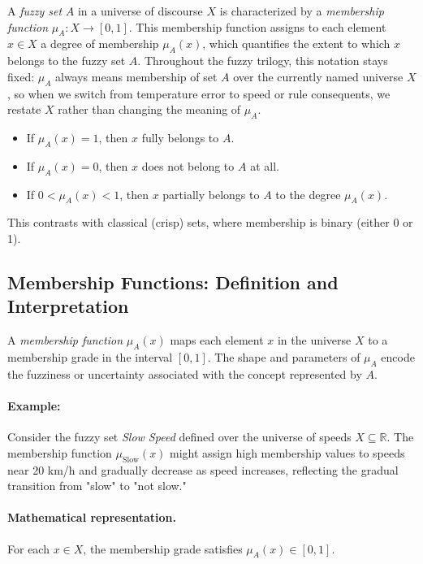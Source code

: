 A \emph{fuzzy set} \( A \) in a universe of discourse \( X \) is characterized by a \emph{membership function} \(\mu_A: X \to [0,1]\). This membership function assigns to each element \( x \in X \) a degree of membership \(\mu_A(x)\), which quantifies the extent to which \( x \) belongs to the fuzzy set \( A \). Throughout the fuzzy trilogy, this notation stays fixed: \(\mu_A\) always means membership of set \(A\) over the currently named universe \(X\), so when we switch from temperature error to speed or rule consequents, we restate \(X\) rather than changing the meaning of \(\mu_A\).

\begin{itemize}
    \item If \(\mu_A(x) = 1\), then \( x \) fully belongs to \( A \).
    \item If \(\mu_A(x) = 0\), then \( x \) does not belong to \( A \) at all.
    \item If \(0 < \mu_A(x) < 1\), then \( x \) partially belongs to \( A \) to the degree \(\mu_A(x)\).
\end{itemize}

This contrasts with classical (crisp) sets, where membership is binary (either 0 or 1).

\subsection{Membership Functions: Definition and Interpretation}
\label{sec:fuzzysets_membership_functions_definition_and_interpretation}

A \emph{membership function} \(\mu_A(x)\) maps each element \( x \) in the universe \( X \) to a membership grade in the interval \([0,1]\). The shape and parameters of \(\mu_A\) encode the fuzziness or uncertainty associated with the concept represented by \( A \).

\paragraph{Example:} Consider the fuzzy set \textit{Slow Speed} defined over the universe of speeds \( X \subseteq \mathbb{R} \). The membership function \(\mu_{\text{Slow}}(x)\) might assign high membership values to speeds near 20 km/h and gradually decrease as speed increases, reflecting the gradual transition from "slow" to "not slow."

\paragraph{Mathematical representation.} For each \(x \in X\), the membership grade satisfies \(\mu_A(x)\in[0,1]\).

